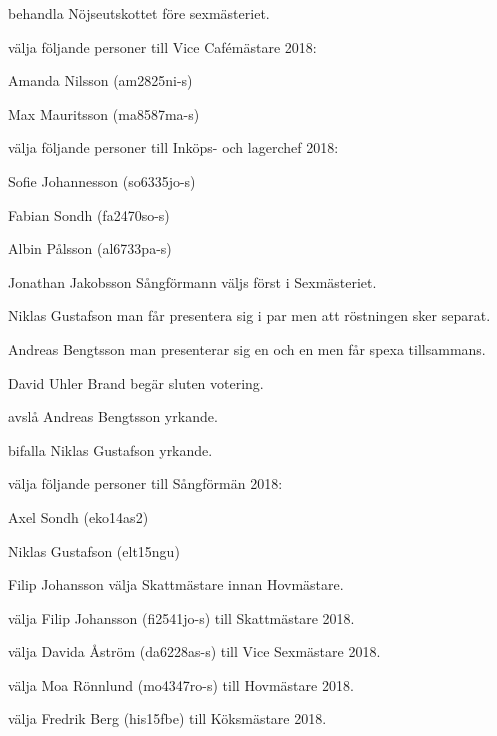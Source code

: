 \documentclass[10pt]{article}
\begin{document}
\begin{paragrafer}
\begin{paralist}
    \Mba behandla Nöjseutskottet före sexmästeriet.

    \Mba välja följande personer till Vice Cafémästare 2018:
    \begin{tightdashlist}
        \item Amanda Nilsson (am2825ni-s)
        \item Max Mauritsson (ma8587ma-s)
    \end{tightdashlist}

    \Mba välja följande personer till Inköps- och lagerchef 2018:
    \begin{tightdashlist}
        \item Sofie Johannesson (so6335jo-s)
        \item Fabian Sondh (fa2470so-s)
        \item Albin Pålsson (al6733pa-s)
    \end{tightdashlist}

    Jonathan Jakobsson \ypa Sångförmann väljs först i Sexmästeriet.

    \Mbaby

    Niklas Gustafson \ypa man får presentera sig i par men att röstningen sker separat.

    Andreas Bengtsson \ypa man presenterar sig en och en men får spexa tillsammans.

    David Uhler Brand begär sluten votering.

    \Mba avslå Andreas Bengtsson yrkande.

    \Mba bifalla Niklas Gustafson yrkande.

    \Mba välja följande personer till Sångförmän 2018:
    \begin{tightdashlist}
        \item Axel Sondh (eko14as2)
        \item Niklas Gustafson (elt15ngu)
    \end{tightdashlist}

    Filip Johansson \ypa välja Skattmästare innan Hovmästare.

    \Mbaby

    \Mba välja Filip Johansson (fi2541jo-s) till Skattmästare 2018.

    \Mba välja Davida Åström (da6228as-s) till Vice Sexmästare 2018.

    \Mba välja Moa Rönnlund (mo4347ro-s) till Hovmästare 2018.

    \Mba välja Fredrik Berg (his15fbe) till Köksmästare 2018.


\end{paralist}
\end{paragrafer}
\end{document}
